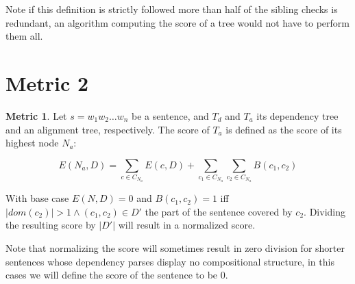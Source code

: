 \documentclass{report}
\theoremstyle{definition}
\newtheorem{metric}{Metric}
\theoremstyle{plain}
\begin{document}
\noindent  Note if this definition is strictly followed more than half of the sibling checks is redundant, an algorithm computing the score of a tree would not have to perform them all.

\section{Metric 2}

\begin{metric}\label{m2}
Let $s = w_1 w_2 \dots w_n$ be a sentence, and $T_d$ and $T_a$ its dependency tree and an alignment tree, respectively. The score of $T_a$ is defined as the score of its highest node $N_{a}$:

$$
E(N_a,D) = \sum_{c\in C_{N_a}} E(c,D)+ \sum_{c_1\in C_{N_a}} \sum_{c_2\in C_{N_a}} B(c_1,c_2)
$$

\noindent With base case $E(N,D) = 0$ and $B(c_1,c_2) = 1$ iff  $|dom(c_2)| > 1 \land (c_1,c_2)\in D'$ the part of the sentence covered by $c_2$. Dividing the resulting score by $|D'|$ will result in a normalized score.
\end{metric}

Note that normalizing the score will sometimes result in zero division for shorter sentences whose dependency parses display no compositional structure, in this cases we will define the score of the sentence to be 0.












\end{document}
